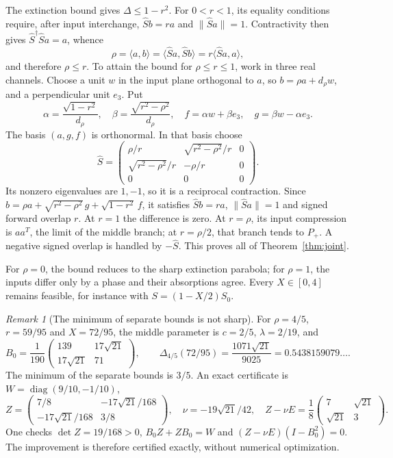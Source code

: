 \documentclass[11pt,a4paper]{article}
\theoremstyle{remark}
\newtheorem{remark}[theorem]{Remark}
\newcommand{\norm}[1]{\lVert #1\rVert}
\newcommand{\ip}[2]{\langle #1,#2\rangle}
\newcommand{\diag}{\operatorname{diag}}
\begin{document}
The extinction bound gives $\Delta\leq1-r^2$. For $0<r<1$, its equality conditions require, after input interchange, $\widehat Sb=ra$ and $\norm{\widehat Sa}=1$. Contractivity then gives $\widehat S^\dagger\widehat Sa=a$, whence
\[
 \rho=\ip ab=\ip{\widehat Sa}{\widehat Sb}
 =r\ip{\widehat Sa}a,
\]
and therefore $\rho\leq r$. To attain the bound for $\rho\leq r\leq1$, work in three real channels. Choose a unit $w$ in the input plane orthogonal to $a$, so $b=\rho a+d_\rho w$, and a perpendicular unit $e_3$. Put
\[
 \alpha=\frac{\sqrt{1-r^2}}{d_\rho},\quad
 \beta=\frac{\sqrt{r^2-\rho^2}}{d_\rho},\quad
 f=\alpha w+\beta e_3,\quad g=\beta w-\alpha e_3.
\]
The basis $(a,g,f)$ is orthonormal. In that basis choose
\[
 \widehat S=\begin{pmatrix}\rho/r&\sqrt{r^2-\rho^2}/r&0\\
 \sqrt{r^2-\rho^2}/r&-\rho/r&0\\0&0&0\end{pmatrix}.
\]
Its nonzero eigenvalues are $1,-1$, so it is a reciprocal contraction. Since $b=\rho a+\sqrt{r^2-\rho^2}\,g+\sqrt{1-r^2}\,f$, it satisfies $\widehat Sb=ra$, $\norm{\widehat Sa}=1$ and signed forward overlap $r$. At $r=1$ the difference is zero. At $r=\rho$, its input compression is $aa^T$, the limit of the middle branch; at $r=\rho/2$, that branch tends to $P_+$. A negative signed overlap is handled by $-\widehat S$. This proves all of Theorem~\ref{thm:joint}.

For $\rho=0$, the bound reduces to the sharp extinction parabola; for $\rho=1$, the inputs differ only by a phase and their absorptions agree. Every $X\in[0,4]$ remains feasible, for instance with $S=(1-X/2)S_0$.

\begin{remark}[The minimum of separate bounds is not sharp]
For $\rho=4/5$, $r=59/95$ and $X=72/95$, the middle parameter is $c=2/5$, $\lambda=2/19$, and
\[
 B_0=\frac1{190}\begin{pmatrix}139&17\sqrt{21}\\17\sqrt{21}&71\end{pmatrix},\qquad
 \Delta_{4/5}(72/95)=\frac{1071\sqrt{21}}{9025}=0.5438159079\ldots.
\]
The minimum of the separate bounds is $3/5$. An exact certificate is $W=\diag(9/10,-1/10)$,
\[
 Z=\begin{pmatrix}7/8&-17\sqrt{21}/168\\-17\sqrt{21}/168&3/8\end{pmatrix},\quad
 \nu=-19\sqrt{21}/42,\quad Z-\nu E=\frac18\begin{pmatrix}7&\sqrt{21}\\\sqrt{21}&3\end{pmatrix}.
\]
One checks $\det Z=19/168>0$, $B_0Z+ZB_0=W$ and $(Z-\nu E)(I-B_0^2)=0$. The improvement is therefore certified exactly, without numerical optimization.
\end{remark}
\end{document}
